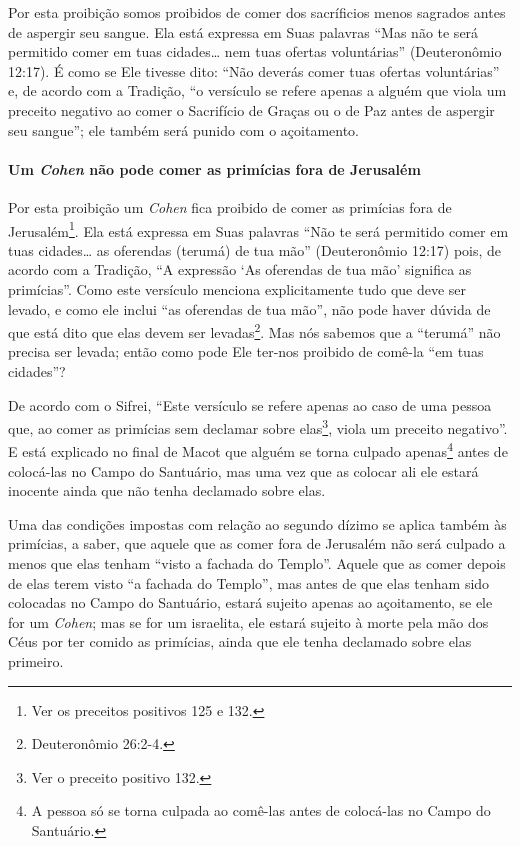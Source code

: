 Por esta proibição somos proibidos de comer dos sacríficios menos
sagrados antes de aspergir seu sangue. Ela está expressa em Suas
palavras ``Mas não te será permitido comer em tuas cidades\ldots{} nem tuas
ofertas voluntárias'' (Deuteronômio 12:17). É como se Ele tivesse dito:
``Não deverás comer tuas ofertas voluntárias'' e, de acordo com a
Tradição, ``o versículo se refere apenas
a alguém que viola um preceito negativo ao comer o Sacrifício de Graças
ou o de Paz antes de aspergir seu sangue''; ele também será punido com o
açoitamento.

\paragraph{Um \textit{Cohen} não pode comer as primícias fora de Jerusalém}

Por esta proibição um \textit{Cohen} fica proibido de comer as primícias fora
de Jerusalém\footnote{Ver os preceitos positivos 125 e 132.}. Ela está expressa em Suas palavras
``Não te será permitido comer em tuas cidades\ldots{} as oferendas (terumá)
de tua mão'' (Deuteronômio 12:17) pois, de acordo com a Tradição, ``A
expressão `As oferendas de tua mão' significa as primícias''. Como este
versículo menciona explicitamente tudo que deve ser levado, e como ele
inclui ``as oferendas de tua mão'', não pode haver dúvida de que está
dito que elas devem ser levadas\footnote{Deuteronômio 26:2-4.}. Mas nós sabemos
que a ``terumá'' não precisa ser levada; então como pode Ele ter-nos
proibido de comê-la ``em tuas cidades''?

De acordo com o Sifrei, ``Este versículo se refere apenas ao caso de uma
pessoa que, ao comer as primícias sem declamar sobre
elas\footnote{Ver o preceito positivo 132.}, viola um preceito negativo''. E está
explicado no final de Macot que alguém se torna culpado
apenas\footnote{A pessoa só se torna culpada ao comê-las antes de colocá-las no
Campo do Santuário.} antes de colocá-las no Campo do Santuário,
mas uma vez que as colocar ali ele estará inocente ainda que não tenha
declamado sobre elas.

Uma das condições impostas com relação ao segundo dízimo se aplica
também às primícias, a saber, que aquele que as comer fora de Jerusalém
não será culpado a menos que elas tenham ``visto a fachada do Templo''.
Aquele que as comer depois de elas terem visto ``a fachada do Templo'',
mas antes de que elas tenham sido colocadas no Campo do Santuário,
estará sujeito apenas ao açoitamento, se ele for um \textit{Cohen}; mas se
for um israelita, ele estará sujeito à morte pela mão dos Céus por ter
comido as primícias, ainda que ele tenha declamado sobre elas primeiro.

